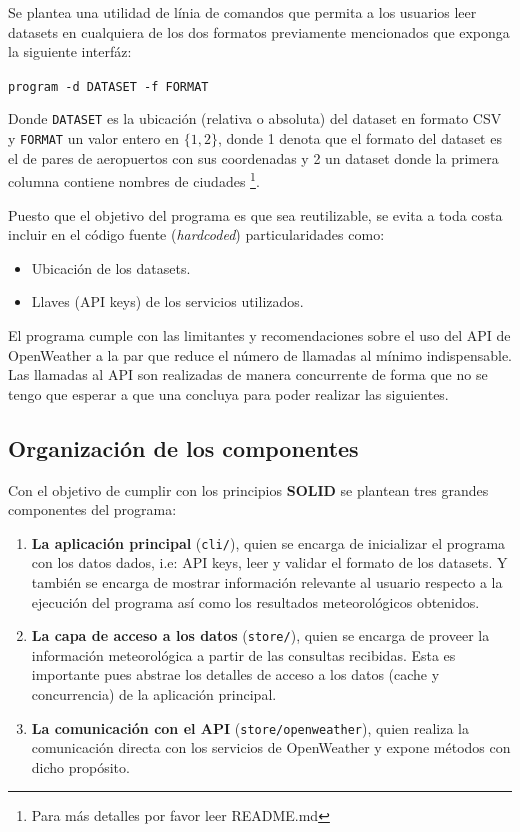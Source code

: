 \documentclass[10pt, letterpaper]{article}
\begin{document}
Se plantea una utilidad de línia de comandos que permita a los usuarios leer datasets en cualquiera
de los dos formatos previamente mencionados que exponga la siguiente interfáz:
\begin{center}
  \texttt{program -d DATASET -f FORMAT}
\end{center}
Donde \texttt{DATASET} es la ubicación (relativa o absoluta) del dataset en formato CSV y
\texttt{FORMAT} un valor entero en $\{1, 2\}$, donde 1 denota que el formato del dataset
es el de pares de aeropuertos con sus coordenadas y 2 un dataset donde la primera columna
contiene nombres de ciudades \footnote{Para más detalles por favor leer README.md}.

Puesto que el objetivo del programa es que sea reutilizable, se evita a toda costa incluir
en el código fuente (\textit{hardcoded}) particularidades como:
\begin{itemize}
  \item Ubicación de los datasets.
  \item Llaves (API keys) de los servicios utilizados.
\end{itemize}

El programa cumple con las limitantes y recomendaciones sobre el uso del API de OpenWeather a la
par que reduce el número de llamadas al mínimo indispensable. Las llamadas al API son realizadas
de manera concurrente de forma que no se tengo que esperar a que una concluya para poder realizar
las siguientes.

\subsection{Organización de los componentes}

Con el objetivo de cumplir con los principios \textbf{SOLID} se plantean tres grandes componentes
del programa:
\begin{enumerate}
  \item \textbf{La aplicación principal} (\texttt{cli/}), quien se encarga de inicializar el programa
  con los datos dados, i.e: API keys, leer y validar el formato de los datasets. Y también se
  encarga de mostrar información relevante al usuario respecto a la ejecución del programa así
  como los resultados meteorológicos obtenidos.
  \item \textbf{La capa de acceso a los datos} (\texttt{store/}), quien se encarga de proveer la
  información meteorológica a partir de las consultas recibidas. Esta es importante pues abstrae
  los detalles de acceso a los datos (cache y concurrencia) de la aplicación principal.
  \item \textbf{La comunicación con el API} (\texttt{store/openweather}), quien realiza la
  comunicación directa con los servicios de OpenWeather y expone métodos con dicho propósito.
\end{enumerate}
\end{document}
